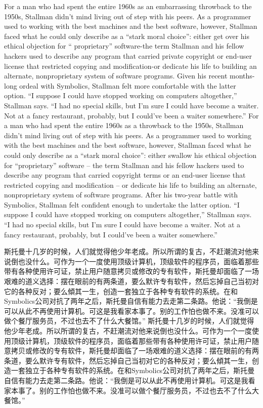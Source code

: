 \ifdefined\eng
\ifdefined\vone
For a man who had spent the entire 1960s as an embarrassing throwback to the 1950s, Stallman didn't mind living out of step with his peers. As a programmer used to working with the best machines and the best software, however, Stallman faced what he could only describe as a ``stark moral choice'': either get over his ethical objection for `` proprietary'' software-the term Stallman and his fellow hackers used to describe any program that carried private copyright or end-user license that restricted copying and modification-or dedicate his life to building an alternate, nonproprietary system of software programs. Given his recent months-long ordeal with Symbolics, Stallman felt more comfortable with the latter option. ``I suppose I could have stopped working on computers altogether,'' Stallman says. ``I had no special skills, but I'm sure I could have become a waiter. Not at a fancy restaurant, probably, but I could've been a waiter somewhere.''
\fi
\ifdefined\vtwo
For a man who had spent the entire 1960s as a throwback to the 1950s, Stallman didn't mind living out of step with his peers. As a programmer used to working with the best machines and the best software, however, Stallman faced what he could only describe as a ``stark moral choice'': either swallow his ethical objection for ``proprietary'' software -- the term Stallman and his fellow hackers used to describe any program that carried copyright terms or an end-user license that restricted copying and modification -- or dedicate his life to building an alternate, nonproprietary system of software programs. After his two-year battle with Symbolics, Stallman felt confident enough to undertake the latter option. ``I suppose I could have stopped working on computers altogether,'' Stallman says. ``I had no special skills, but I'm sure I could have become a waiter. Not at a fancy restaurant, probably, but I could've been a waiter somewhere.''
\fi
\fi

\ifdefined\chs
\ifdefined\vone
斯托曼十几岁的时候，人们就觉得他少年老成。所以所谓的复古，不赶潮流对他来说倒也没什么。可作为一个一度使用顶级计算机，顶级软件的程序员，面临着那些带有各种使用许可证，禁止用户随意拷贝或修改的专有软件，斯托曼却面临了一场艰难的道义选择：摆在眼前的有两条道，要么默许专有软件，然后忘掉自己当初对它的各种反对；要么傾其一生，创造一套独立于各种专有软件的系统。在和Symbolics公司对抗了两年之后，斯托曼自信有能力去走第二条路。他说：``我倒是可以从此不再使用计算机。可这是我看家本事了。别的工作怕也做不来。没准可以做个餐厅服务员，不过也去不了什么大餐馆。''
\fi
\ifdefined\vtwo
斯托曼十几岁的时候，人们就觉得他少年老成。所以所谓的复古，不赶潮流对他来说倒也没什么。可作为一个一度使用顶级计算机，顶级软件的程序员，面临着那些带有各种使用许可证，禁止用户随意拷贝或修改的专有软件，斯托曼却面临了一场艰难的道义选择：摆在眼前的有两条道，要么默许专有软件，然后忘掉自己当初对它的各种反对；要么傾其一生，创造一套独立于各种专有软件的系统。在和Symbolics公司对抗了两年之后，斯托曼自信有能力去走第二条路。他说：``我倒是可以从此不再使用计算机。可这是我看家本事了。别的工作怕也做不来。没准可以做个餐厅服务员，不过也去不了什么大餐馆。''
\fi
\fi

